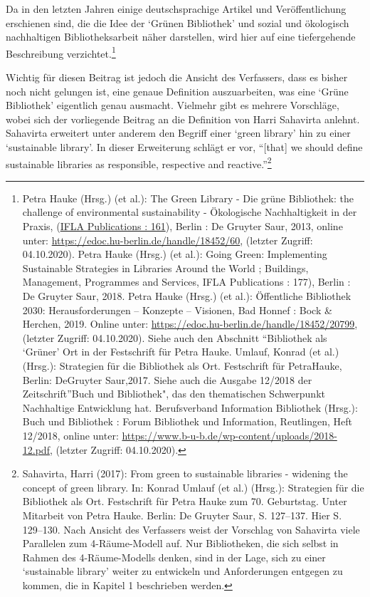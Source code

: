\documentclass[a4paper,
fontsize=11pt,
oneside,
numbers=noperiodatend,
parskip=half-,
bibliography=totoc,
final
]{scrartcl}
\begin{document}
Da in den letzten Jahren einige deutschsprachige Artikel und
Veröffentlichung erschienen sind, die die Idee der \enquote*{Grünen
Bibliothek} und sozial und ökologisch nachhaltigen Bibliotheksarbeit
näher darstellen, wird hier auf eine tiefergehende Beschreibung
verzichtet.\footnote{Petra Hauke (Hrsg.) (et al.): The Green Library -
  Die grüne Bibliothek: the challenge of environmental sustainability -
  Ökologische Nachhaltigkeit in der Praxis,
  (\href{https://www.degruyter.com/view/serial/IFLA-B}{IFLA Publications
  : 161}), Berlin : De Gruyter Saur, 2013, online unter:
  \url{https://edoc.hu-berlin.de/handle/18452/60}, (letzter Zugriff:
  04.10.2020). \textbar{} Petra Hauke (Hrsg.) (et al.): Going Green:
  Implementing Sustainable Strategies in Libraries Around the World ;
  Buildings, Management, Programmes and Services, IFLA Publications :
  177), Berlin : De Gruyter Saur, 2018. \textbar{} Petra Hauke (Hrsg.)
  (et al.): Öffentliche Bibliothek 2030: Herausforderungen -- Konzepte
  -- Visionen, Bad Honnef : Bock \& Herchen, 2019. Online unter:
  \url{https://edoc.hu-berlin.de/handle/18452/20799}, (letzter Zugriff:
  04.10.2020). \textbar{} Siehe auch den Abschnitt \enquote{Bibliothek
  als \enquote*{Grüner} Ort in der Festschrift für Petra Hauke. Umlauf,
  Konrad (et al.) (Hrsg.): Strategien für die Bibliothek als Ort.
  Festschrift für PetraHauke, Berlin: DeGruyter Saur,2017. \textbar{}
  Siehe auch die Ausgabe 12/2018 der Zeitschrift}Buch und Bibliothek",
  das den thematischen Schwerpunkt Nachhaltige Entwicklung hat.
  Berufsverband Information Bibliothek (Hrsg.): Buch und Bibliothek :
  Forum Bibliothek und Information, Reutlingen, Heft 12/2018, online
  unter: \url{https://www.b-u-b.de/wp-content/uploads/2018-12.pdf},
  (letzter Zugriff: 04.10.2020).}

Wichtig für diesen Beitrag ist jedoch die Ansicht des Verfassers, dass
es bisher noch nicht gelungen ist, eine genaue Definition auszuarbeiten,
was eine \enquote*{Grüne Bibliothek} eigentlich genau ausmacht. Vielmehr
gibt es mehrere Vorschläge, wobei sich der vorliegende Beitrag an die
Definition von Harri Sahavirta anlehnt. Sahavirta erweitert unter
anderem den Begriff einer \enquote*{green library} hin zu einer
\enquote*{sustainable library}. In dieser Erweiterung schlägt er vor,
\enquote{{[}that{]} we should define sustainable libraries as
responsible, respective and reactive.}\footnote{Sahavirta, Harri (2017):
  From green to sustainable libraries - widening the concept of green
  library. In: Konrad Umlauf (et al.) (Hrsg.): Strategien für die
  Bibliothek als Ort. Festschrift für Petra Hauke zum 70. Geburtstag.
  Unter Mitarbeit von Petra Hauke. Berlin: De Gruyter Saur, S. 127--137.
  Hier S. 129--130. Nach Ansicht des Verfassers weist der Vorschlag von
  Sahavirta viele Parallelen zum 4-Räume-Modell auf. Nur Bibliotheken,
  die sich selbst in Rahmen des 4-Räume-Modells denken, sind in der
  Lage, sich zu einer \enquote*{sustainable library} weiter zu
  entwickeln und Anforderungen entgegen zu kommen, die in Kapitel 1
  beschrieben werden.}
\end{document}
